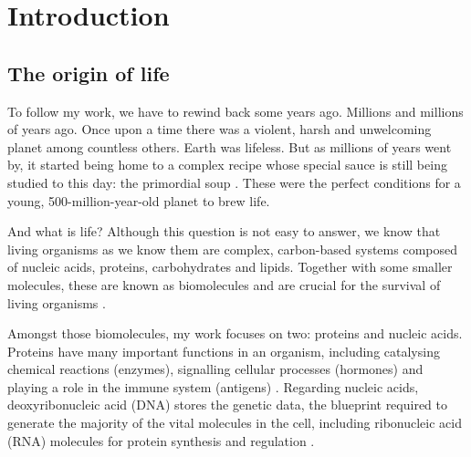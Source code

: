 \chapter{Introduction}

\section{The origin of life}

To follow my work, we have to rewind back some years ago. Millions and millions of years ago.
Once upon a time there was a violent, harsh and unwelcoming planet among countless others. Earth was lifeless. But as millions of years went by, it started being home to a complex recipe whose special sauce is still being studied to this day: the primordial soup \cite{gilbert:1986td}. These were the perfect conditions for a young, 500-million-year-old planet to brew life.

And what is life? Although this question is not easy to answer, we know that living organisms as we know them are complex, carbon-based systems composed of nucleic acids, proteins, carbohydrates and lipids. Together with some smaller molecules, these are known as biomolecules and are crucial for the survival of living organisms \cite{alberts:2008vj}.

Amongst those biomolecules, my work focuses on two: proteins and nucleic acids. Proteins have many important functions in an organism, including catalysing chemical reactions (enzymes), signalling cellular processes (hormones) and playing a role in the immune system (antigens) \cite{alberts:2008vj}. Regarding nucleic acids, deoxyribonucleic acid (DNA) stores the genetic data, the blueprint required to generate the majority of the vital molecules in the cell, including ribonucleic acid (RNA) molecules for protein synthesis and regulation \cite{alberts:2008vj}.


